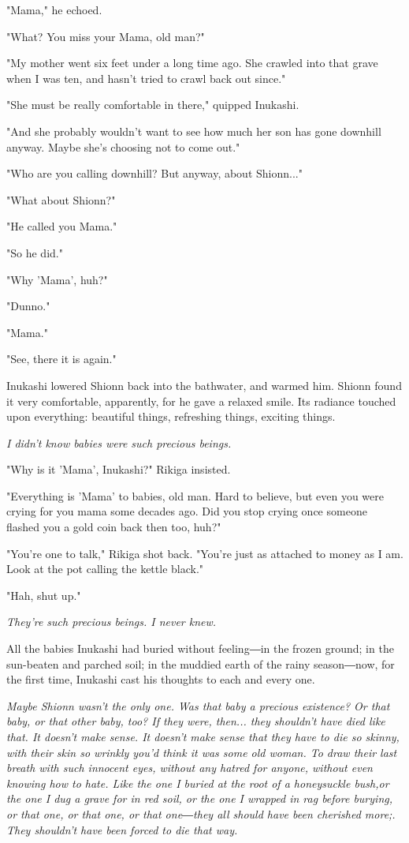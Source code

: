 "Mama," he echoed.

"What? You miss your Mama, old man?"

"My mother went six feet under a long time ago. She crawled into that
grave when I was ten, and hasn't tried to crawl back out since."

"She must be really comfortable in there," quipped Inukashi.~

"And she probably wouldn't want to see how much her son has gone
downhill anyway. Maybe she's choosing not to come out."

"Who are you calling downhill? But anyway, about Shionn..."

"What about Shionn?"

"He called you Mama."

"So he did."

"Why 'Mama', huh?"

"Dunno."

"Mama."

"See, there it is again."

Inukashi lowered Shionn back into the bathwater, and warmed him. Shionn
found it very comfortable, apparently, for he gave a relaxed smile. Its
radiance touched upon everything: beautiful things, refreshing things,
exciting things.

\emph{I didn't know babies were such precious beings.}

"Why is it 'Mama', Inukashi?" Rikiga insisted.

"Everything is 'Mama' to babies, old man. Hard to believe, but even you
were crying for you mama some decades ago. Did you stop crying once
someone flashed you a gold coin back then too, huh?"

"You're one to talk," Rikiga shot back. "You're just as attached to
money as I am. Look at the pot calling the kettle black."

"Hah, shut up."

\emph{They're such precious beings. I never knew.}

All the babies Inukashi had buried without feeling―in the frozen ground;
in the sun-beaten and parched soil; in the muddied earth of the rainy
season―now, for the first time, Inukashi cast his thoughts to each and
every one.

\emph{Maybe Shionn wasn't the only one. Was that baby a precious existence? Or
that baby, or that other baby, too? If they were, then... they shouldn't
have died like that. It doesn't make sense. It doesn't make sense that
they have to die so skinny, with their skin so wrinkly you'd think it
was some old woman. To draw their last breath with such innocent eyes,
without any hatred for anyone, without even knowing how to hate. Like
the one I buried at the root of a honeysuckle bush,or the one I dug a
grave for in red soil, or the one I wrapped in rag before burying, or
that one, or that one, or that one―they all should have been cherished
more;. They shouldn't have been forced to die that way.}

